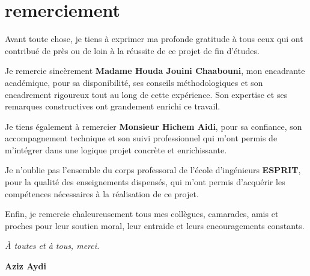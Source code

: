 \chapter*{\Large \center remerciement}

Avant toute chose, je tiens à exprimer ma profonde gratitude à tous ceux qui ont contribué de près ou de loin à la réussite de ce projet de fin d'études.

Je remercie sincèrement \textbf{Madame Houda Jouini Chaabouni}, mon encadrante académique, pour sa disponibilité, ses conseils méthodologiques et son encadrement rigoureux tout au long de cette expérience. Son expertise et ses remarques constructives ont grandement enrichi ce travail.

Je tiens également à remercier \textbf{Monsieur Hichem Aidi}, pour sa confiance, son accompagnement technique et son suivi professionnel qui m'ont permis de m’intégrer dans une logique projet concrète et enrichissante.

Je n’oublie pas l’ensemble du corps professoral de l’école d’ingénieurs \textbf{ESPRIT}, pour la qualité des enseignements dispensés, qui m’ont permis d’acquérir les compétences nécessaires à la réalisation de ce projet.

Enfin, je remercie chaleureusement tous mes collègues, camarades, amis et proches pour leur soutien moral, leur entraide et leurs encouragements constants.

\bigskip

\hfill \textit{À toutes et à tous, merci.}

\hfill\textbf {Aziz Aydi}\\